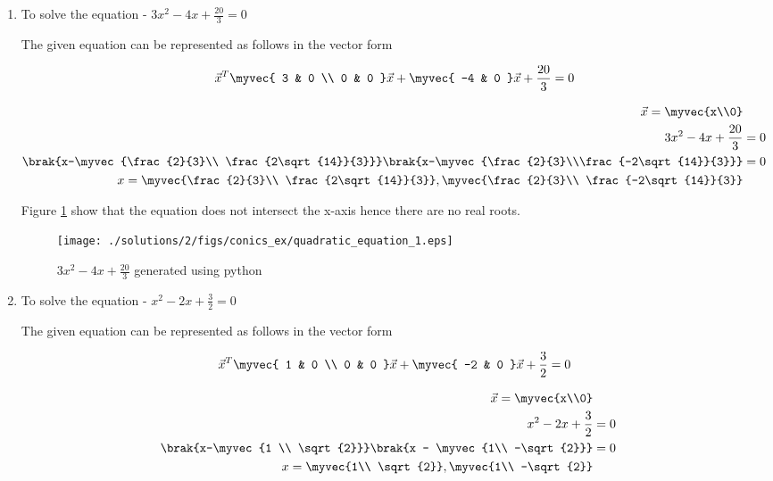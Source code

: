 \begin{enumerate}


\item To solve the equation - $3x^2-4x+\frac{20}{3} = 0$ 
\begin{flushleft}
The given equation can be represented as follows in the vector form
\end{flushleft}
\begin{align}
\vec{x}^T 
\myvec{
3 & 0 \\
0 & 0
}
\vec{x} + 
\myvec{
-4 & 0 
}
\vec{x} + \frac{20}{3} = 0
\end{align}

\begin{align}
\vec{x} = \myvec{x\\0} \\
3x^2-4x+\frac{20}{3} &= 0 \\
\brak{x-\myvec{\frac{2}{3}\\ \frac{2\sqrt{14}}{3}}}\brak{x-\myvec{\frac{2}{3}\\\frac{-2\sqrt{14}}{3}}} &= 0 \\
x = \myvec{\frac{2}{3}\\ \frac{2\sqrt{14}}{3}},\myvec{\frac{2}{3}\\ \frac{-2\sqrt{14}}{3}}
\end{align}

Figure \ref{fig:5.2.2_quadeq1_conics_ex} show that the equation does not intersect the x-axis hence there are no real roots. 

\begin{figure}[!ht]
\centering
\texttt{[image: ./solutions/2/figs/conics\_ex/quadratic\_equation\_1.eps]}
\caption{$3x^2-4x+\frac{20}{3}$ generated using python}
\label{fig:5.2.2_quadeq1_conics_ex}
\end{figure} 
\item To solve the equation - $x^2-2x+\frac{3}{2} = 0$ 
\begin{flushleft}
The given equation can be represented as follows in the vector form
\end{flushleft}
\begin{align}
\vec{x}^T 
\myvec{
1 & 0 \\
0 & 0
}
\vec{x} + 
\myvec{
-2 & 0 
}
\vec{x} + \frac{3}{2} = 0
\end{align}

\begin{align}
\vec{x} = \myvec{x\\0}\\
x^2-2x+\frac{3}{2} &= 0 \\
\brak{x-\myvec{1 \\ \sqrt{2}}}\brak{x - \myvec{1\\ -\sqrt{2}}} &= 0 \\
x = \myvec{1\\ \sqrt{2}}, \myvec{1\\ -\sqrt{2}}
\end{align}


\end{enumerate}
